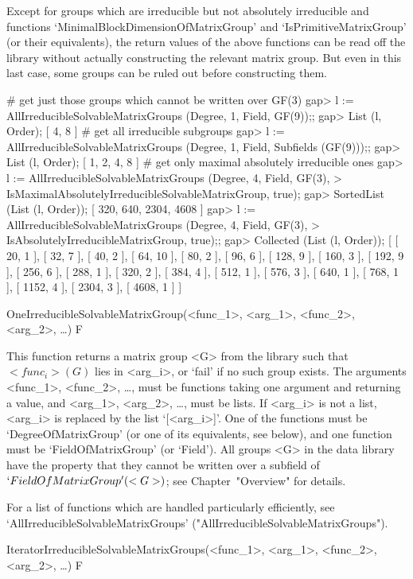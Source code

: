 \endlist
Except for groups which are irreducible but not absolutely irreducible and functions
`MinimalBlockDimensionOfMatrixGroup' and `IsPrimitiveMatrixGroup' (or their
equivalents), the return values of the above functions can be read off the
{\IRREDSOL} library without actually constructing the relevant matrix group.
But even in this last case, some groups can be ruled out before constructing
them.

\beginexample
# get just those groups which cannot be written over GF(3)
gap> l := AllIrreducibleSolvableMatrixGroups (Degree, 1, Field, GF(9));;
gap> List (l, Order);
[ 4, 8 ]
# get all irreducible subgroups
gap> l := AllIrreducibleSolvableMatrixGroups (Degree, 1, Field, Subfields (GF(9)));;
gap> List (l, Order);
[ 1, 2, 4, 8 ]
# get only maximal absolutely irreducible ones
gap> l := AllIrreducibleSolvableMatrixGroups (Degree, 4, Field, GF(3),
>             IsMaximalAbsolutelyIrreducibleSolvableMatrixGroup, true);
gap> SortedList (List (l, Order));
[ 320, 640, 2304, 4608 ]
gap> l := AllIrreducibleSolvableMatrixGroups (Degree, 4, Field, GF(3),
> IsAbsolutelyIrreducibleMatrixGroup, true);;
gap> Collected (List (l, Order));
[ [ 20, 1 ], [ 32, 7 ], [ 40, 2 ], [ 64, 10 ], [ 80, 2 ], [ 96, 6 ], 
  [ 128, 9 ], [ 160, 3 ], [ 192, 9 ], [ 256, 6 ], [ 288, 1 ], [ 320, 2 ], 
  [ 384, 4 ], [ 512, 1 ], [ 576, 3 ], [ 640, 1 ], [ 768, 1 ], [ 1152, 4 ], 
  [ 2304, 3 ], [ 4608, 1 ] ]
\endexample

\>OneIrreducibleSolvableMatrixGroup(<func_1>, <arg_1>, <func_2>, <arg_2>, \dots) F

This function returns a matrix group <G> from the {\IRREDSOL} library such that
$<func_i>(G)$ lies in <arg_i>, or `fail' if no such group exists. The arguments <func_1>,
<func_2>, \dots, must be {\GAP} functions taking one argument and returning a value, and
<arg_1>, <arg_2>, \dots,  must be lists. If <arg_i> is not a list, <arg_i> is replaced by
the list `[<arg_i>]'. One of the functions must be `DegreeOfMatrixGroup' (or one of its
equivalents, see below), and one function must be  `FieldOfMatrixGroup' (or `Field'). All
groups <G> in the data library have the property that they cannot be written over a
subfield of $`FieldOfMatrixGroup'(<G>)$; see Chapter~"Overview" for details. 

For a list of functions which are handled particularly efficiently, see
`AllIrreducibleSolvableMatrixGroups' ("AllIrreducibleSolvableMatrixGroups").

\>IteratorIrreducibleSolvableMatrixGroups(<func_1>, <arg_1>, <func_2>, <arg_2>, \dots) F


